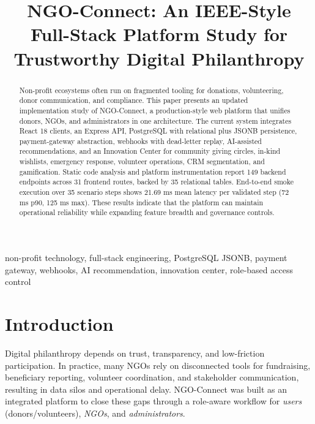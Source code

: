 \documentclass[conference]{IEEEtran}
\begin{document}
\title{NGO-Connect: An IEEE-Style Full-Stack Platform Study for Trustworthy Digital Philanthropy}

\author{
}

\maketitle

\begin{abstract}
Non-profit ecosystems often run on fragmented tooling for donations, volunteering, donor communication, and compliance. This paper presents an updated implementation study of NGO-Connect, a production-style web platform that unifies donors, NGOs, and administrators in one architecture. The current system integrates React 18 clients, an Express API, PostgreSQL with relational plus JSONB persistence, payment-gateway abstraction, webhooks with dead-letter replay, AI-assisted recommendations, and an Innovation Center for community giving circles, in-kind wishlists, emergency response, volunteer operations, CRM segmentation, and gamification. Static code analysis and platform instrumentation report 149 backend endpoints across 31 frontend routes, backed by 35 relational tables. End-to-end smoke execution over 35 scenario steps shows 21.69 ms mean latency per validated step (72 ms p90, 125 ms max). These results indicate that the platform can maintain operational reliability while expanding feature breadth and governance controls.
\end{abstract}

\begin{IEEEkeywords}
non-profit technology, full-stack engineering, PostgreSQL JSONB, payment gateway, webhooks, AI recommendation, innovation center, role-based access control
\end{IEEEkeywords}

\section{Introduction}
Digital philanthropy depends on trust, transparency, and low-friction participation. In practice, many NGOs rely on disconnected tools for fundraising, beneficiary reporting, volunteer coordination, and stakeholder communication, resulting in data silos and operational delay. NGO-Connect was built as an integrated platform to close these gaps through a role-aware workflow for \textit{users} (donors/volunteers), \textit{NGOs}, and \textit{administrators}.
\end{document}
